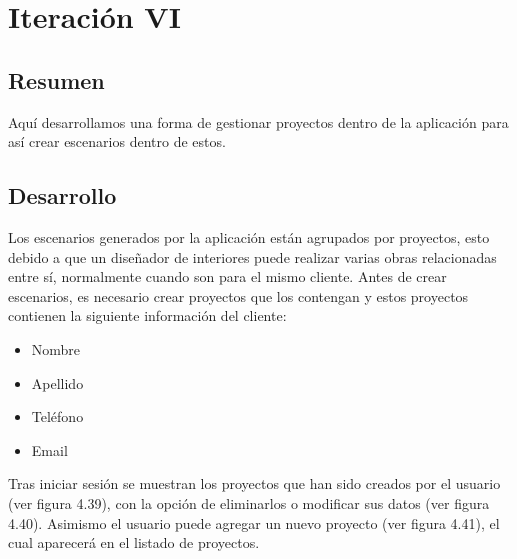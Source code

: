 \section{Iteración VI}
\subsection{Resumen}
Aquí desarrollamos una forma de gestionar proyectos dentro de la aplicación para así crear escenarios dentro de estos.

\subsection{Desarrollo}
Los escenarios generados por la aplicación están agrupados por proyectos, esto debido a que un diseñador de interiores puede realizar varias obras relacionadas entre sí, normalmente cuando son para el mismo cliente. Antes de crear escenarios, es necesario crear proyectos que los contengan y estos proyectos contienen la siguiente información del cliente:
\begin{itemize}
	\item Nombre
	\item Apellido
	\item Teléfono
	\item Email
\end{itemize}

Tras iniciar sesión se muestran los proyectos que han sido creados por el usuario (ver figura 4.39), con la opción de eliminarlos o modificar sus datos (ver figura 4.40). Asimismo el usuario puede agregar un nuevo proyecto (ver figura 4.41), el cual aparecerá en el listado de proyectos.



